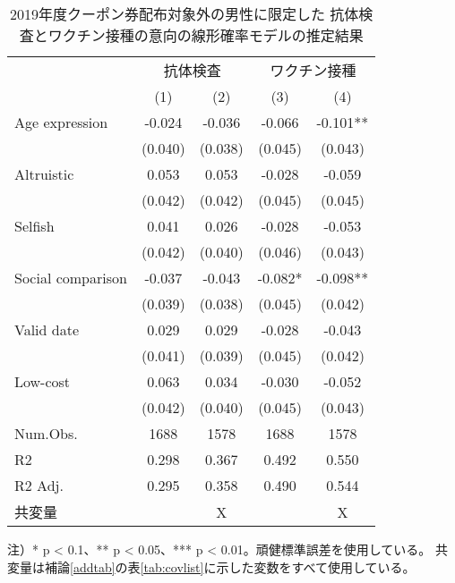 \documentclass[
  11pt,
  a4paper,
]{article}
\begin{document}
\begin{table}

\caption{\label{tab:show-int-coupon0-reg}2019年度クーポン券配布対象外の男性に限定した 抗体検査とワクチン接種の意向の線形確率モデルの推定結果}
\centering
\begin{threeparttable}
\begin{tabular}[t]{lcccc}
\toprule
\multicolumn{1}{c}{ } & \multicolumn{2}{c}{抗体検査} & \multicolumn{2}{c}{ワクチン接種} \\
\cmidrule(l{3pt}r{3pt}){2-3} \cmidrule(l{3pt}r{3pt}){4-5}
  & (1) & (2) & (3) & (4)\\
\midrule
Age expression & -0.024 & -0.036 & -0.066 & -0.101**\\
 & (0.040) & (0.038) & (0.045) & (0.043)\\
Altruistic & 0.053 & 0.053 & -0.028 & -0.059\\
 & (0.042) & (0.042) & (0.045) & (0.045)\\
Selfish & 0.041 & 0.026 & -0.028 & -0.053\\
 & (0.042) & (0.040) & (0.046) & (0.043)\\
Social comparison & -0.037 & -0.043 & -0.082* & -0.098**\\
 & (0.039) & (0.038) & (0.045) & (0.042)\\
Valid date & 0.029 & 0.029 & -0.028 & -0.043\\
 & (0.041) & (0.039) & (0.045) & (0.042)\\
Low-cost & 0.063 & 0.034 & -0.030 & -0.052\\
 & (0.042) & (0.040) & (0.045) & (0.043)\\
\midrule
Num.Obs. & 1688 & 1578 & 1688 & 1578\\
R2 & 0.298 & 0.367 & 0.492 & 0.550\\
R2 Adj. & 0.295 & 0.358 & 0.490 & 0.544\\
共変量 &  & X &  & X\\
\bottomrule
\end{tabular}
\begin{tablenotes}
\item 注）* p < 0.1、** p < 0.05、*** p < 0.01。頑健標準誤差を使用している。 共変量は補論\ref{addtab}の表\ref{tab:covlist}に示した変数をすべて使用している。
\end{tablenotes}
\end{threeparttable}
\end{table}
\end{document}
